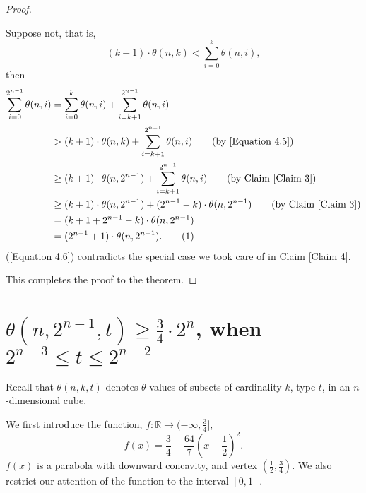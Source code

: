 \documentclass[12pt]{ucthesis}
\newcommand\numberthis{\addtocounter{equation}{1}\tag{\theequation}}
\theoremstyle{plain}
\theoremstyle{definition}
\begin{document}
\begin{proof}
\begin{enumerate}[(1)]
	Suppose not, that is,
	\begin{equation}
	\label{Equation 4.5}
	(k + 1) \cdot \theta(n, k) < \sum_{i = 0}^k \theta(n, i),
	\end{equation}
	then
	\begin{align*}
	\sum_{i = 0}^{2^{n - 1}} \theta(n, i)
	& = \sum_{i = 0}^k \theta(n, i) + \sum_{i = k + 1}^{2^{n - 1}} \theta(n, i) \\
	& > (k + 1) \cdot \theta(n, k) + \sum_{i = k + 1}^{2^{n - 1}} \theta(n, i) \tag{by \ref{Equation 4.5}} \\
	& \ge (k + 1) \cdot \theta(n, 2^{n - 1}) + \sum_{i = k + 1}^{2^{n - 1}} \theta(n, i) \tag{by Claim \ref{Claim 3}} \\
	& \ge (k + 1) \cdot \theta(n, 2^{n - 1}) + (2^{n - 1} - k) \cdot \theta(n, 2^{n - 1}) \tag{by Claim \ref{Claim 3}} \\
	& = (k + 1 + 2^{n - 1} - k) \cdot \theta(n, 2^{n - 1}) \\
	& = (2^{n - 1} + 1) \cdot \theta(n, 2^{n - 1}). \numberthis \label{Equation 4.6}
	\end{align*}
	(\ref{Equation 4.6}) contradicts the special case we took care of in Claim \ref{Claim 4}.
\end{enumerate}
This completes the proof to the theorem.
\end{proof}

\section{$\theta(n, 2^{n - 1}, t) \ge \frac{3}{4} \cdot 2^n$, when $2^{n - 3} \le t \le 2^{n - 2}$}
\label{Section 4.2}

Recall that $\theta(n, k, t)$ denotes $\theta$ values of subsets of cardinality $k$,
type $t$, in an $n$-dimensional cube.

We first introduce the function,
$f \colon \mathbb{R} \rightarrow (-\infty, \frac{3}{4}]$,
\begin{equation*}
f(x) = \frac{3}{4} - \frac{64}{7} (x - \frac{1}{2})^2.
\end{equation*}
$f(x)$ is a parabola with downward concavity, and vertex $(\frac{1}{2}, \frac{3}{4})$.
We also restrict our attention of the function to the interval $[0, 1]$.
\end{document}
